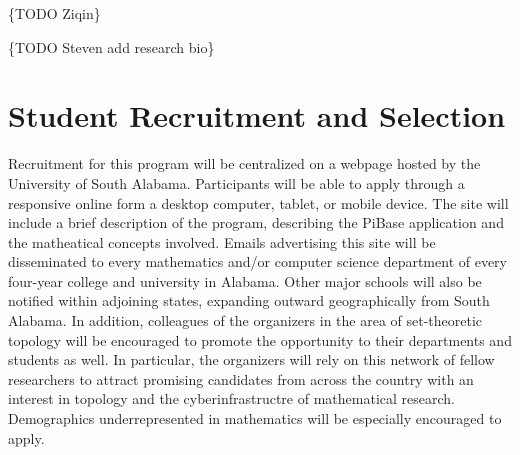 \{TODO Ziqin\}

\{TODO Steven add research bio\}

\section{Student Recruitment and Selection}

Recruitment for this program will be centralized on a webpage hosted
by the University of South Alabama. Participants will be able to apply
through a responsive online form a desktop computer, tablet, or mobile device.
The site will include a brief description of the program, describing the
PiBase application and the matheatical concepts involved.
Emails advertising this site will be disseminated to every mathematics
and/or computer science department of every four-year college and
university in Alabama. Other major schools will also be notified within
adjoining states, expanding outward geographically from South Alabama.
In addition, colleagues of the organizers in the area of set-theoretic
topology will be encouraged to promote the opportunity to their departments
and students as well. In particular, the organizers will rely on this
network of fellow researchers to attract promising candidates from across
the country with an interest in topology and the cyberinfrastructre of
mathematical research. Demographics underrepresented in mathematics
will be especially encouraged to apply.

